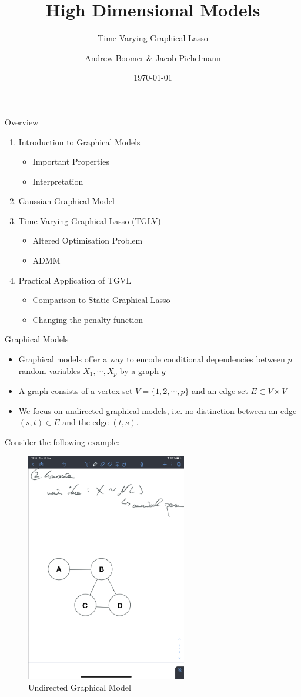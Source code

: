 \documentclass{beamer}
\title[High Dimensional Models] %
{High Dimensional Models}
\subtitle{Time-Varying Graphical Lasso}
\author[Andrew Boomer \& Jacob Pichelmann] %
{Andrew Boomer \& Jacob Pichelmann}
\institute []
{Toulouse School of Economics \\ M2 EEE}
\date{\today}
\begin{document}
\frame{\titlepage}
    

\begin{frame}{Overview}
	\begin{enumerate}
		\item Introduction to Graphical Models
		\begin{itemize}
			\item Important Properties
			\item Interpretation
		\end{itemize}
		\item Gaussian Graphical Model
		\item Time Varying Graphical Lasso (TGLV)
		\begin{itemize}
			\item Altered Optimisation Problem
			\item ADMM
		\end{itemize}
		\item Practical Application of TGVL
		\begin{itemize}
			\item Comparison to Static Graphical Lasso
			\item Changing the penalty function
		\end{itemize}
		\end{enumerate}
\end{frame}

\begin{frame}{Graphical Models}
\begin{itemize}
	\item Graphical models offer a way to encode conditional dependencies between $p$ random variables $X_1, \cdots, X_p$ by a graph $g$
	\item A graph consists of a vertex set $V = \{1,2, \cdots, p\}$ and an edge set $E \subset V \times V$
	\item We focus on undirected graphical models, i.e. no distinction between an edge $(s, t) \in E$ and the edge $(t,s)$.
\end{itemize}
Consider the following example:
\begin{figure}
	\caption{Undirected Graphical Model}
	\includegraphics[trim={2cm 2cm 10cm 38cm}, clip, width = 7cm]{graphs/IMG_0091}
\end{figure}
\end{frame}
\end{document}

